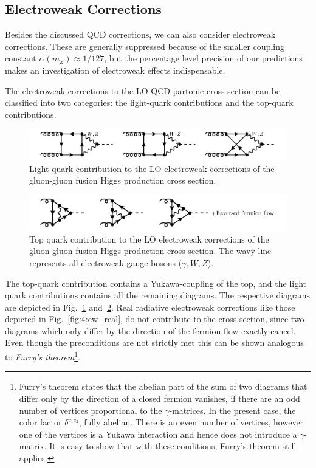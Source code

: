 \subsection{Electroweak Corrections}
Besides the discussed \acs{QCD} corrections, we can also consider electroweak corrections. These are generally suppressed because of the smaller coupling constant $\alpha (m_Z) \approx 1/127$, but the percentage level precision of our predictions makes an investigation of electroweak effects indispensable.

The electroweak corrections to the \acs{LO} \acs{QCD} partonic cross section can be classified into two categories: the light-quark contributions and the top-quark contributions.
\begin{figure}[h]
  \centering
  \includegraphics[width=\figurewidth]{Images/electro_weak_light.pdf}
  \caption{Light quark contribution to the \acs{LO} electroweak corrections of the gluon-gluon fusion Higgs production cross section.}
  \label{fig:4:ew_lq}
\end{figure}
\begin{figure}[h]
  \centering
  \includegraphics[width=\figurewidth]{Images/electro_weak_top.pdf}
  \caption{Top quark contribution to the \acs{LO} electroweak corrections of the gluon-gluon fusion Higgs production cross section. The wavy line represents all electroweak gauge bosons ($\gamma, W, Z$).}
  \label{fig:4:ew_top}
\end{figure}
The top-quark contribution contains a Yukawa-coupling of the top, and the light quark contributions contains all the remaining diagrams. The respective diagrams are depicted in Fig.~\ref{fig:4:ew_lq} and\ \ref{fig:4:ew_top}. Real radiative electroweak corrections like those depicted in Fig.~\ref{fig:4:ew_real}, do not contribute to the cross section, since two diagrams which only differ by the direction of the fermion flow exactly cancel. Even though the preconditions are not strictly met this can be shown analogous to \textit{Furry's theorem}\footnote{Furry's theorem states that the abelian part of the sum of two diagrams that differ only by the direction of a closed fermion vanishes, if there are an odd number of vertices proportional to the $\gamma$-matrices. In the present case, the color factor $\delta^{c_1 c_2}$, \ie fully abelian. There is an even number of vertices, however one of the vertices is a Yukawa interaction and hence does not introduce a $\gamma$-matrix. It is easy to show that with these conditions, Furry's theorem still applies.}.

